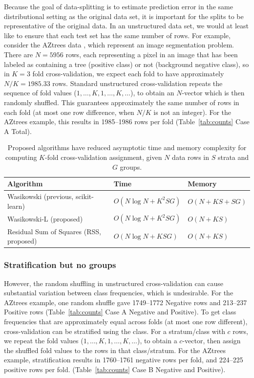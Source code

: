 \documentclass[twoside]{article}
\begin{document}
Because the goal of data-splitting is to estimate prediction error in the same distributional setting as the original data set, it is important for the splits to be representative of the original data.
In an unstructured data set, we would at least like to ensure that each test set has the same number of rows.
For example, consider the AZtrees data \citep{Hocking2026soak}, which represent an image segmentation problem.
There are $N=5956$ rows, each representing a pixel in an image that has been labeled as containing a tree (positive class) or not (background negative class), so in $K=3$ fold cross-validation, we expect each fold to have approximately $N/K=1985.33$ rows.
Standard unstructured cross-validation repeats the sequence of fold values ($1, \dots, K, 1, \dots, K, \dots$), to obtain an $N$-vector which is then randomly shuffled.
This guarantees approximately the same number of rows in each fold (at most one row difference, when $N/K$ is not an integer).
For the AZtrees example, this results in 1985--1986 rows per fold (Table~\ref{tab:counts} Case A Total).

\begin{table}[t]
  \centering
  \begin{tabular}{l|l|l}
    Algorithm &  Time    & Memory \\
    \hline
    Wasikowski (previous, scikit-learn) & $O(N\log N + K^2SG)$ & $O(N + KS + SG)$\\
    Wasikowski-L (proposed) & $O(N\log N + K^2SG)$ & $O(N + KS)$\\
        Residual Sum of Squares (RSS, proposed) & $O(N\log N + KSG)$  & $O(N + KS)$
    \end{tabular}
    \caption{Proposed algorithms have reduced asymptotic time and memory complexity for computing $K$-fold cross-validation assignment, given $N$ data rows in $S$ strata and $G$ groups.}
    \label{tab:complexity}
\end{table}

\subsubsection{
  Stratification but no groups}

However, the random shuffling in unstructured cross-validation can cause substantial variation between class frequencies, which is undesirable.
For the AZtrees example, one random shuffle gave 1749--1772 Negative rows and 213--237 Positive rows (Table~\ref{tab:counts} Case A Negative and Positive).
To get class frequencies that are approximately equal across folds (at most one row different), cross-validation can be stratified using the class.
For a stratum/class with $c$ rows, we repeat the fold values ($1, \dots, K, 1, \dots, K, \dots$), to obtain a $c$-vector, then assign the shuffled fold values to the rows in that class/stratum.
For the AZtrees example, stratification results in 1760--1761 negative rows per fold, and 224--225 positive rows per fold.
(Table~\ref{tab:counts} Case B Negative and Positive).
\end{document}
